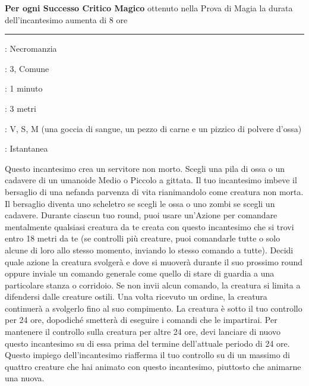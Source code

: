 \begin{multicols}{2}
\textbf{Per ogni Successo Critico Magico} ottenuto nella Prova di Magia la durata dell'incantesimo aumenta di 8 ore

\smallskip\noindent\rule{\linewidth}{2pt} \hypertarget{Animare Morti}{}\medskip{}
\noindent
\begin{description}[noitemsep, topsep=0pt, parsep=0pt, partopsep=0pt, leftmargin=0cm, labelwidth=2.8cm]
\item[\textbf{Lista di Magia}]: Necromanzia
\item[\textbf{Livello}]: 3, Comune
\item[\textbf{T. di Lancio}]: 1 minuto
\item[\textbf{Gittata}]: 3 metri
\item[\textbf{Componenti}]: V, S, M (una goccia di sangue, un pezzo di carne e un pizzico di polvere d'ossa)
\item[\textbf{Durata}]: Istantanea
\end{description}

Questo incantesimo crea un servitore non morto. Scegli una pila di ossa o un cadavere di un umanoide Medio o Piccolo a gittata. Il tuo incantesimo imbeve il bersaglio di una nefanda parvenza di vita rianimandolo come creatura non morta. Il bersaglio diventa uno scheletro se scegli le ossa o uno zombi se scegli un cadavere. Durante ciascun tuo round, puoi usare un'Azione per comandare mentalmente qualsiasi creatura da te creata con questo incantesimo che si trovi entro 18 metri da te (se controlli più creature, puoi comandarle tutte o solo alcune di loro allo stesso momento, inviando lo stesso comando a tutte). Decidi quale azione la creatura svolgerà e dove si muoverà durante il suo prossimo round oppure inviale un comando generale come quello di stare di guardia a una particolare stanza o corridoio. Se non invii alcun comando, la creatura si limita a difendersi dalle creature ostili. Una volta ricevuto un ordine, la creatura continuerà a svolgerlo fino al suo compimento. La creatura è sotto il tuo controllo per 24 ore, dopodiché smetterà di eseguire i comandi che le impartirai. Per mantenere il controllo sulla creatura per altre 24 ore, devi lanciare di nuovo questo incantesimo su di essa prima del termine dell'attuale periodo di 24 ore. Questo impiego dell'incantesimo riafferma il tuo controllo su di un massimo di quattro creature che hai animato con questo incantesimo, piuttosto che animarne una nuova.


\end{multicols}
